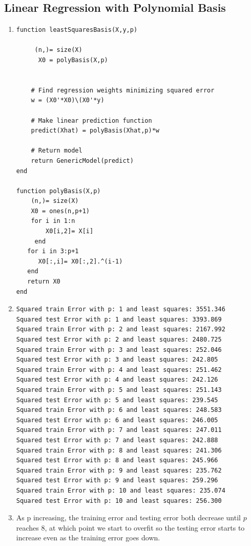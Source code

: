 \documentclass{article}
\begin{document}
\vspace{10em}
\subsection{Linear Regression with Polynomial Basis}

\begin{enumerate}
 
\item
\begin{verbatim}
function leastSquaresBasis(X,y,p)

     (n,)= size(X)
      X0 = polyBasis(X,p)


    # Find regression weights minimizing squared error
    w = (X0'*X0)\(X0'*y)

    # Make linear prediction function
    predict(Xhat) = polyBasis(Xhat,p)*w

    # Return model
    return GenericModel(predict)
end

function polyBasis(X,p)
    (n,)= size(X)
    X0 = ones(n,p+1)
    for i in 1:n
        X0[i,2]= X[i]
     end 
   for i in 3:p+1
      X0[:,i]= X0[:,2].^(i-1)
   end
   return X0
end 
 \end{verbatim}


\item
 \begin{verbatim}
Squared train Error with p: 1 and least squares: 3551.346
Squared test Error with p: 1 and least squares: 3393.869
Squared train Error with p: 2 and least squares: 2167.992
Squared test Error with p: 2 and least squares: 2480.725
Squared train Error with p: 3 and least squares: 252.046
Squared test Error with p: 3 and least squares: 242.805
Squared train Error with p: 4 and least squares: 251.462
Squared test Error with p: 4 and least squares: 242.126
Squared train Error with p: 5 and least squares: 251.143
Squared test Error with p: 5 and least squares: 239.545
Squared train Error with p: 6 and least squares: 248.583
Squared test Error with p: 6 and least squares: 246.005
Squared train Error with p: 7 and least squares: 247.011
Squared test Error with p: 7 and least squares: 242.888
Squared train Error with p: 8 and least squares: 241.306
Squared test Error with p: 8 and least squares: 245.966
Squared train Error with p: 9 and least squares: 235.762
Squared test Error with p: 9 and least squares: 259.296
Squared train Error with p: 10 and least squares: 235.074
Squared test Error with p: 10 and least squares: 256.300
 \end{verbatim}

\item As p increasing, the training error and testing error both decrease until $p$ reaches 8, at which point we start to overfit so the testing error starts to increase even as the training error goes down.

\end{enumerate}
\end{document}

